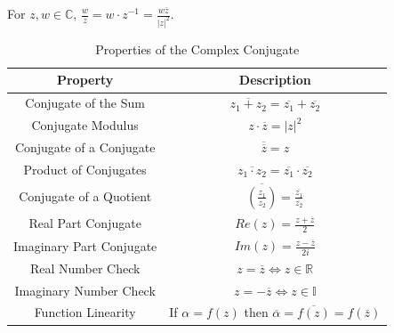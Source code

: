 \begin{definition}
    [Division]
    For $z, w \in \mathbb{C}$, $\frac{w}{z} = w \cdot z^{-1} = \frac{w\overline{z}}{|z|^2}$.
\end{definition}
\begin{table}[H]
    \centering
    \caption{Properties of the Complex Conjugate}
    \begin{tabular}{|c|c|}
        \hline
        \textbf{Property}        & \textbf{Description}                                                              \\
        \hline
        Conjugate of the Sum     & $\overline{z_1 + z_2} = \overline{z_1} + \overline{z_2}$                          \\
        \hline
        Conjugate Modulus        & $ z \cdot \overline{z}= |z|^2$                                                    \\
        \hline
        Conjugate of a Conjugate & $\overline{\overline{z}} = z$                                                     \\
        \hline
        Product of Conjugates    & $\overline{z_1 \cdot z_2} = \overline{z_1} \cdot \overline{z_2}$                  \\
        \hline
        Conjugate of a Quotient  & $\overline{\left(\frac{z_1}{z_2}\right)} = \frac{\overline{z_1}}{\overline{z_2}}$ \\
        \hline
        Real Part Conjugate      & $Re(z) = \frac{z + \overline{z}}{2}$                                              \\
        \hline
        Imaginary Part Conjugate & $Im(z) = \frac{z - \overline{z}}{2i}$                                             \\
        \hline
        Real Number Check        & $z = \overline{z} \iff z \in \mathbb{R}$                                          \\
        \hline
        Imaginary Number Check   & $z = -\overline{z} \iff z \in \mathbb{I}$                                         \\
        \hline
        Function Linearity       & If $\alpha = f(z)$ then $\overline{\alpha} = \overline{f(z)} = f(\overline{z})$   \\
        \hline
    \end{tabular}
\end{table}

